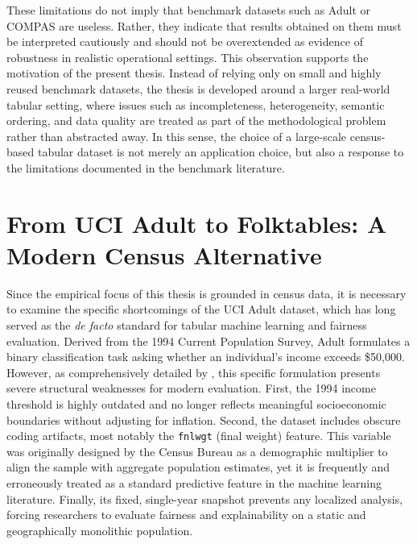 These limitations do not imply that benchmark datasets such as Adult or COMPAS are useless. Rather, they indicate that results obtained on them must be interpreted cautiously and should not be overextended as evidence of robustness in realistic operational settings. This observation supports the motivation of the present thesis. Instead of relying only on small and highly reused benchmark datasets, the thesis is developed around a larger real-world tabular setting, where issues such as incompleteness, heterogeneity, semantic ordering, and data quality are treated as part of the methodological problem rather than abstracted away. In this sense, the choice of a large-scale census-based tabular dataset is not merely an application choice, but also a response to the limitations documented in the benchmark literature.

\section{From UCI Adult to Folktables: A Modern Census Alternative}
\label{sec:adult-to-folktables}
Since the empirical focus of this thesis is grounded in census data, it is necessary to examine the specific shortcomings of the UCI Adult dataset, which has long served as the \emph{de facto} standard for tabular machine learning and fairness evaluation. Derived from the 1994 Current Population Survey, Adult formulates a binary classification task asking whether an individual's income exceeds \$50,000. However, as comprehensively detailed by \textcite{ding2021retiring}, this specific formulation presents severe structural weaknesses for modern evaluation. First, the 1994 income threshold is highly outdated and no longer reflects meaningful socioeconomic boundaries without adjusting for inflation. Second, the dataset includes obscure coding artifacts, most notably the \texttt{fnlwgt} (final weight) feature. This variable was originally designed by the Census Bureau as a demographic multiplier to align the sample with aggregate population estimates, yet it is frequently and erroneously treated as a standard predictive feature in the machine learning literature. Finally, its fixed, single-year snapshot prevents any localized analysis, forcing researchers to evaluate fairness and explainability on a static and geographically monolithic population.

